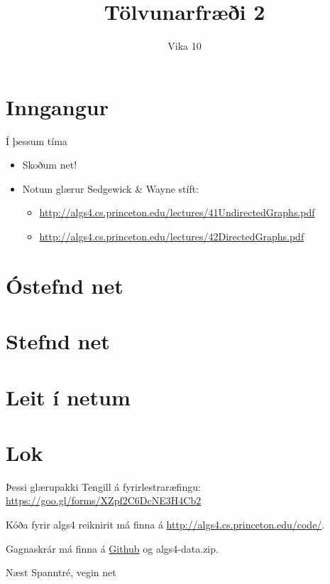 \documentclass{beamer}
\title{Tölvunarfræði 2}
\subtitle{Vika 10}
\begin{document}
\begin{frame}
\titlepage
\end{frame}

\section{Inngangur}

\begin{frame}{Í þessum tíma}
\begin{itemize}
 \item Skoðum net!
 \item Notum glærur Sedgewick \& Wayne stíft:
 \begin{itemize}
  \item \url{http://algs4.cs.princeton.edu/lectures/41UndirectedGraphs.pdf}
  \item \url{http://algs4.cs.princeton.edu/lectures/42DirectedGraphs.pdf}
 \end{itemize}
\end{itemize}
\end{frame}

\section{Óstefnd net}

\section{Stefnd net}

\section{Leit í netum}

\section{Lok}

\begin{frame}{Þessi glærupakki}
Tengill á fyrirlestraræfingu: \url{https://goo.gl/forms/XZpf2C6DcNE3H4Cb2}
\vspace{1cm}

Kóða fyrir algs4 reiknirit má finna á \url{http://algs4.cs.princeton.edu/code/}.

Gagnaskrár má finna á \href{https://github.com/Ernir/kennsluefni/tree/master/T2/Code/w10}{Github} og algs4-data.zip.
\end{frame}

\begin{frame}{Næst}
Spanntré, vegin net
\end{frame}
\end{document}
